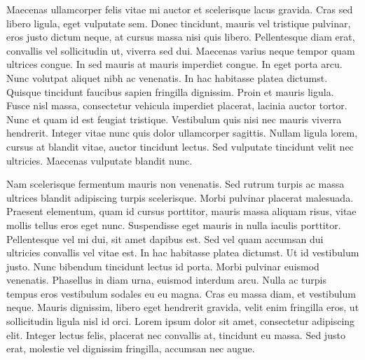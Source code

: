 Maecenas ullamcorper felis vitae mi auctor et scelerisque lacus gravida.
Cras sed libero ligula, eget vulputate sem.
Donec tincidunt, mauris vel tristique pulvinar, eros justo dictum neque, at cursus massa nisi quis libero.
Pellentesque diam erat, convallis vel sollicitudin ut, viverra sed dui.
Maecenas varius neque tempor quam ultrices congue.
In sed mauris at mauris imperdiet congue.
In eget porta arcu.
Nunc volutpat aliquet nibh ac venenatis.
In hac habitasse platea dictumst.
Quisque tincidunt faucibus sapien fringilla dignissim.
Proin et mauris ligula.
Fusce nisl massa, consectetur vehicula imperdiet placerat, lacinia auctor tortor.
Nunc et quam id est feugiat tristique.
Vestibulum quis nisi nec mauris viverra hendrerit.
Integer vitae nunc quis dolor ullamcorper sagittis.
Nullam ligula lorem, cursus at blandit vitae, auctor tincidunt lectus.
Sed vulputate tincidunt velit nec ultricies.
Maecenas vulputate blandit nunc.

Nam scelerisque fermentum mauris non venenatis.
Sed rutrum turpis ac massa ultrices blandit adipiscing turpis scelerisque.
Morbi pulvinar placerat malesuada.
Praesent elementum, quam id cursus porttitor, mauris massa aliquam risus, vitae mollis tellus eros eget nunc.
Suspendisse eget mauris in nulla iaculis porttitor.
Pellentesque vel mi dui, sit amet dapibus est.
Sed vel quam accumsan dui ultricies convallis vel vitae est.
In hac habitasse platea dictumst.
Ut id vestibulum justo.
Nunc bibendum tincidunt lectus id porta.
Morbi pulvinar euismod venenatis.
Phasellus in diam urna, euismod interdum arcu.
Nulla ac turpis tempus eros vestibulum sodales eu eu magna.
Cras eu massa diam, et vestibulum neque.
Mauris dignissim, libero eget hendrerit gravida, velit enim fringilla eros, ut sollicitudin ligula nisl id orci.
Lorem ipsum dolor sit amet, consectetur adipiscing elit.
Integer lectus felis, placerat nec convallis at, tincidunt eu massa.
Sed justo erat, molestie vel dignissim fringilla, accumsan nec augue.

